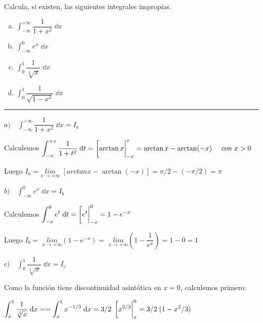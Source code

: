 \begin{miejercicio}
	Calcula, si existen, las siguientes integrales impropias.
	
	\begin{multicols}{2}
	\begin{enumerate}[a) ]
	\item $\displaystyle \int_{-\infty}^{+\infty} \dfrac {1}{1+x^2} \; \dd x$
	\item $\displaystyle \int_{-\infty}^{0} e^x \; \dd x$
	\item $\displaystyle \int_{0}^{1} \dfrac {1}{\sqrt[3]{x}} \; \dd x$
	\item $\displaystyle \int_{0}^{1} \dfrac {1}{\sqrt{1-x^2}} \; \dd x$
	\end{enumerate}
	\end{multicols}


\rule{200pt}{0.1pt}

\vspace{3mm}	


\vspace{4mm} $a) \quad \displaystyle \int_{-\infty}^{+\infty} \dfrac {1}{1+x^2} \; \dd x=I_a$

\vspace{2mm} Calculemos $\displaystyle \int_{-x}^{+x} \dfrac {1}{1+t^2} \; \dd t= \eval[\arctan x|_{-x}^x=\arctan x - \arctan(-x)\quad \ { con } \; x>0$

\vspace{2mm} Luego $\displaystyle I_a= \underset{x\to +\infty}{lim}\;{\left[ arctan x - \arctan(-x) \right] } = \pi/2 - (-\pi/2)=\pi$


\vspace{4mm} $b) \quad \displaystyle \int_{-\infty}^{0} e^x \; \dd x=I_b$

\vspace{2mm} Calculemos $\displaystyle \int_{-x}^{0} e^t \; \dd t= \eval [e^t|_{-x}^0= 1-e^{-x}$

\vspace{2mm} Luego $\displaystyle I_b=$
$\underset {x\to + \infty}{lim}{(1-e^{-x})}=$
$\underset {x\to + \infty}{lim}{\left(1-\dfrac {1}{e^x}\right)}=1-0=1$


\vspace{4mm} $c) \quad \displaystyle \int_{0}^{1} \dfrac {1}{\sqrt[3]{x}} \; \dd x=I_c$

\vspace{2mm} Como la función tiene discontinuidad asintótica en $x=0$, calculemos primero:

\vspace{2mm} $\displaystyle \int_{x}^{1} \dfrac {1}{\sqrt[3]{x}} \; \dd x= =\int_{x}^{1} x^{-1/3} \; \dd x=3/2\;  \eval[x^{2/3}|_x^0= 3/2\; (1-x^2/3)$


\end{miejercicio}
